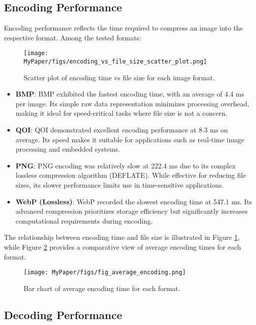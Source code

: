 \documentclass[conference]{IEEEtran}
\begin{document}
\subsection{Encoding Performance}

Encoding performance reflects the time required to compress an image into the respective format. Among the tested formats:

\begin{figure}[H]
    \centering
    \texttt{[image: MyPaper/figs/encoding\_vs\_file\_size\_scatter\_plot.png]}
    \caption{Scatter plot of encoding time vs file size for each image format.}
    \label{fig:encoding_scatter}
\end{figure}

\begin{itemize}
    \item \textbf{BMP}: BMP exhibited the fastest encoding time, with an average of 4.4 ms per image. Its simple raw data representation minimizes processing overhead, making it ideal for speed-critical tasks where file size is not a concern.
    \item \textbf{QOI}: QOI demonstrated excellent encoding performance at 8.3 ms on average. Its speed makes it suitable for applications such as real-time image processing and embedded systems.
    \item \textbf{PNG}: PNG encoding was relatively slow at 222.4 ms due to its complex lossless compression algorithm (DEFLATE). While effective for reducing file sizes, its slower performance limits use in time-sensitive applications.
    \item \textbf{WebP (Lossless)}: WebP recorded the slowest encoding time at 547.1 ms. Its advanced compression prioritizes storage efficiency but significantly increases computational requirements during encoding.
\end{itemize}

The relationship between encoding time and file size is illustrated in Figure \ref{fig:encoding_scatter}, while Figure \ref{fig:encoding_bar} provides a comparative view of average encoding times for each format.

\begin{figure}[htbp]
    \centering
    \texttt{[image: MyPaper/figs/fig\_average\_encoding.png]}
    \caption{Bar chart of average encoding time for each format.}
    \label{fig:encoding_bar}
\end{figure}

\subsection{Decoding Performance}
\end{document}
